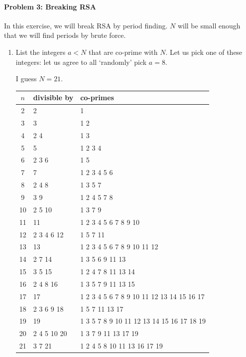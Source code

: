 \documentclass[12pt]{article}
\newenvironment{answer}{\begingroup\setlength{\leftskip}{-\leftmargin}\begin{framed}}{\end{framed}\endgroup}
\begin{document}
\paragraph{Problem 3: Breaking RSA} \hfill

In this exercise, we will break RSA by period finding. $N$ will be small enough that we will find periods by brute force.

\begin{enumerate}
    \item List the integers $a < N$ that are co-prime with $N$. Let us pick one of these integers: let us agree to all `randomly' pick $a = 8$.

    \begin{answer}
        I guess $N = 21$.
        \begin{tabular}{c|l|l}
            $n$ & divisible by & co-primes\\
            \hline
            2 & 2 & 1 \\
            3 & 3 & 1 2 \\
            4 & 2 4 & 1 3 \\
            5 & 5 & 1 2 3 4 \\
            6 & 2 3 6 & 1 5 \\
            7 & 7 & 1 2 3 4 5 6 \\
            8 & 2 4 8 & 1 3 5 7 \\
            9 & 3 9 & 1 2 4 5 7 8 \\
            10 & 2 5 10 & 1 3 7 9 \\
            11 & 11 & 1 2 3 4 5 6 7 8 9 10 \\
            12 & 2 3 4 6 12 & 1 5 7 11 \\
            13 & 13 & 1 2 3 4 5 6 7 8 9 10 11 12 \\
            14 & 2 7 14 & 1 3 5 6 9 11 13 \\
            15 & 3 5 15 & 1 2 4 7 8 11 13 14 \\
            16 & 2 4 8 16 & 1 3 5 7 9 11 13 15 \\
            17 & 17 & 1 2 3 4 5 6 7 8 9 10 11 12 13 14 15 16 17 \\
            18 & 2 3 6 9 18 & 1 5 7 11 13 17 \\
            19 & 19 & 1 3 5 7 8 9 10 11 12 13 14 15 16 17 18 19 \\
            20 & 2 4 5 10 20 & 1 3 7 9 11 13 17 19 \\
            21 & 3 7 21 & 1 2 4 5 8 10 11 13 16 17 19 \\
        \end{tabular}
    \end{answer}


\end{enumerate}
\end{document}
